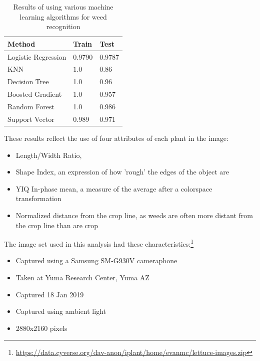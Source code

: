 \documentclass[12pt]{article}
\begin{document}
{\renewcommand{\arraystretch}{2}%
\begin{table}[H]
	\centering
   	 \begin{tabular}{  l  p{4cm}  p{5cm} }
        	\toprule
		\textbf{Method}      
		& \textbf{Train}   
		& \textbf{Test} \\\midrule
		Logistic Regression
		& 0.9790       
		& 0.9787 \\\hline
		KNN     
		& $1.0$                    
		& $0.86$ \\\hline
		Decision Tree
		& 1.0
		& 0.96 \\\hline
		Boosted Gradient     
		& 1.0
		& 0.957 \\\hline
		Random Forest      
		& 1.0
		& 0.986 \\\hline
		Support Vector
		& 0.989
		& 0.971 \\\hline
       	 \bottomrule
	\end{tabular}
    	\caption[Various Machine Learning Algorithms]{Results of using various machine learning algorithms for weed recognition}
 	 \label{fig:learning}
\end{table}

These results reflect the use of four attributes of each plant in the image:
\begin{itemize}
	\item{Length/Width Ratio, }
	\item{Shape Index, an expression of how 'rough' the edges of the object are}
	\item{YIQ In-phase mean, a measure of the average after a colorspace transformation}
	\item{Normalized distance from the crop line, as weeds are often more distant from the crop line than are crop}
\end{itemize}

The image set used in this analysis had these characteristics:\footnote{\url{https://data.cyverse.org/dav-anon/iplant/home/evanmc/lettuce-images.zip}}
\begin{itemize}
	\item{Captured using a Samsung SM-G930V cameraphone}
	\item{Taken at Yuma Research Center, Yuma AZ}
	\item{Captured 18 Jan 2019}
	\item{Captured using ambient light}
	\item{2880x2160 pixels}
\end{itemize}

}
\end{document}
